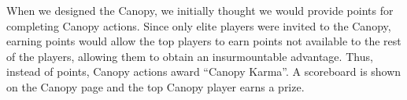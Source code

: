 When we designed the Canopy, we initially thought we would provide points for completing Canopy actions. Since only elite players were invited to the Canopy, earning points would allow the top players to earn points not available to the rest of the players, allowing them to obtain an insurmountable advantage. Thus, instead of points, Canopy actions award ``Canopy Karma''. A scoreboard is shown on the Canopy page and the top Canopy player earns a prize.
